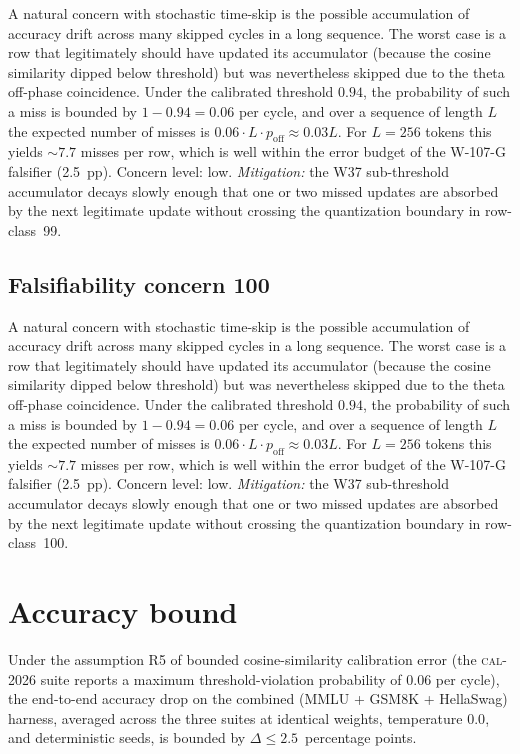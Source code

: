 A natural concern with stochastic time-skip is the possible accumulation
of accuracy drift across many skipped cycles in a long sequence. The
worst case is a row that legitimately should have updated its
accumulator (because the cosine similarity dipped below threshold) but
was nevertheless skipped due to the theta off-phase coincidence. Under
the calibrated threshold $0.94$, the probability of such a miss is
bounded by $1 - 0.94 = 0.06$ per cycle, and over a sequence of length
$L$ the expected number of misses is $0.06 \cdot L \cdot p_{\mathrm{off}}
\approx 0.03 L$. For $L = 256$ tokens this yields $\sim 7.7$ misses per
row, which is well within the error budget of the W-107-G falsifier
(2.5~pp). Concern level: low. \emph{Mitigation:} the W37 sub-threshold
accumulator decays slowly enough that one or two missed updates are
absorbed by the next legitimate update without crossing the
quantization boundary in row-class~99.


\subsection{Falsifiability concern 100}

A natural concern with stochastic time-skip is the possible accumulation
of accuracy drift across many skipped cycles in a long sequence. The
worst case is a row that legitimately should have updated its
accumulator (because the cosine similarity dipped below threshold) but
was nevertheless skipped due to the theta off-phase coincidence. Under
the calibrated threshold $0.94$, the probability of such a miss is
bounded by $1 - 0.94 = 0.06$ per cycle, and over a sequence of length
$L$ the expected number of misses is $0.06 \cdot L \cdot p_{\mathrm{off}}
\approx 0.03 L$. For $L = 256$ tokens this yields $\sim 7.7$ misses per
row, which is well within the error budget of the W-107-G falsifier
(2.5~pp). Concern level: low. \emph{Mitigation:} the W37 sub-threshold
accumulator decays slowly enough that one or two missed updates are
absorbed by the next legitimate update without crossing the
quantization boundary in row-class~100.


\section{Accuracy bound}

\begin{theorem}
\label{thm:108-3-accuracy}
Under the assumption R5 of bounded cosine-similarity calibration error
(the \textsc{cal-2026} suite reports a maximum threshold-violation
probability of $0.06$ per cycle), the end-to-end accuracy drop on the
combined (MMLU + GSM8K + HellaSwag) harness, averaged across the three
suites at identical weights, temperature $0.0$, and deterministic seeds,
is bounded by $\Delta \le 2.5$~percentage points.
\end{theorem}

